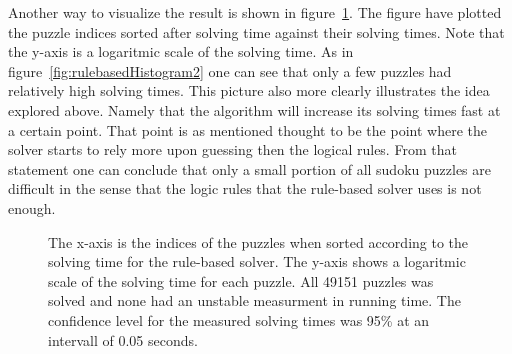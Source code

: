 \documentclass[a4paper,11pt]{kth-mag}
\begin{document}
\FloatBarrier
Another way to visualize the result is shown in figure~\ref{fig:rulebasedIndices}.
The figure have plotted the puzzle indices sorted after solving time against their solving times.
Note that the y-axis is a logaritmic scale of the solving time.
As in figure~\ref{fig:rulebasedHistogram2} one can see that only a few puzzles had relatively high solving times.
This picture also more clearly illustrates the idea explored above.
Namely that the algorithm will increase its solving times fast at a certain point.
That point is as mentioned thought to be the point where the solver starts to rely more upon guessing then the logical rules.
From that statement one can conclude that only a small portion of all sudoku puzzles are difficult in the sense that the logic rules that the rule-based solver uses is not enough.
\\
\begin{figure}[here] 
\noindent{}
\vspace{-25pt}
\caption{The x-axis is the indices of the puzzles when sorted according to the solving time for the rule-based solver. The y-axis shows a logaritmic scale of the solving time for each puzzle. All 49151 puzzles was solved and none had an unstable measurment in running time. The confidence level for the measured solving times was 95\% at an intervall of 0.05 seconds.}
\label{fig:rulebasedIndices}
\end{figure}

\FloatBarrier
\end{document}
